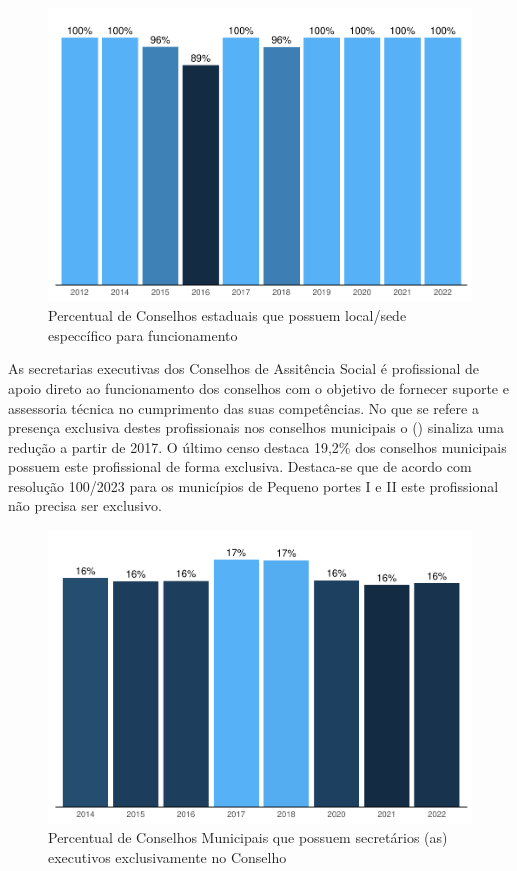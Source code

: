 \documentclass[
  brazilian]{report}
\begin{document}
\begin{figure}
\includegraphics{Censo-SUAS-2022_files/figure-latex/ceas_sede-1} \caption[Percentual de Conselhos estaduais que possuem local/sede especcífico para funcionamento]{Percentual de Conselhos estaduais que possuem local/sede especcífico para funcionamento}\label{fig:ceas_sede}
\end{figure}

As secretarias executivas dos Conselhos de Assitência Social é
profissional de apoio direto ao funcionamento dos conselhos com o
objetivo de fornecer suporte e assessoria técnica no cumprimento das
suas competências. No que se refere a presença exclusiva destes
profissionais nos conselhos municipais o () sinaliza
uma redução a partir de 2017. O último censo destaca 19,2\% dos
conselhos municipais possuem este profissional de forma exclusiva.
Destaca-se que de acordo com resolução 100/2023 para os municípios de
Pequeno portes I e II este profissional não precisa ser exclusivo.

\begin{figure}
\includegraphics{Censo-SUAS-2022_files/figure-latex/cmas_se-1} \caption[Percentual de Conselhos Municipais que possuem secretários (as) executivos exclusivamente no Conselho]{Percentual de Conselhos Municipais que possuem secretários (as) executivos exclusivamente no Conselho}\label{fig:cmas_se}
\end{figure}
\end{document}
